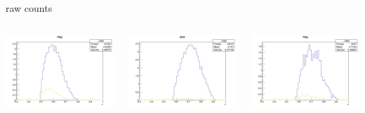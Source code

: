 \begin{frame}{raw counts}
\begin{columns}
\begin{column}[T]{0.25\textwidth}
\includegraphics[width = \textwidth]{results/yield/statistics/yield_x_Q2_z_0.65_5.500_0.60_neg.png}
\end{column}
\begin{column}[T]{0.25\textwidth}
\includegraphics[width = \textwidth]{results/yield/statistics/yield_x_Q2_z_0.65_5.500_0.70_pos.png}
\end{column}
\begin{column}[T]{0.25\textwidth}
\includegraphics[width = \textwidth]{results/yield/statistics/yield_x_Q2_z_0.65_5.500_0.70_neg.png}
\end{column}
\end{columns}
\end{frame}
